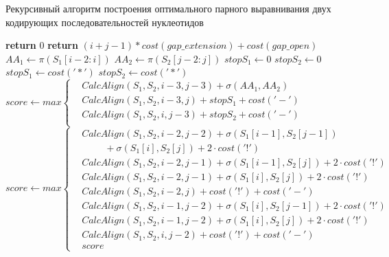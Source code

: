 \begin{algorithm}
	\caption{Рекурсивный алгоритм построения оптимального парного выравнивания двух кодирующих последовательностей нуклеотидов} \label{lst:pairwise}
	\begin{algorithmic}
		 
			\State \textbf{return} $0$ 
		\EndIf
			\State \textbf{return} $(i+j-1)*cost(gap\_extension) + cost(gap\_open)$ 
		\EndIf
		\State $AA_1 \gets \pi(S_1[i-2:i])$ 
		\State $AA_2 \gets \pi(S_2[j-2:j])$
		\State $stopS_1 \gets 0$
		\State $stopS_2 \gets 0$ 
			\State $stopS_1 \gets cost('*')$ 
		\EndIf
			\State $stopS_2 \gets cost('*')$ 
		\EndIf {}
		\State $score \gets max\left\{
		\begin{aligned}
			& CalcAlign(S_1, S_2, i-3, j-3) + \sigma(AA_1, AA_2)\\
			& CalcAlign(S_1, S_2, i-3, j) + stopS_1 + cost('-')\\
			& CalcAlign(S_1, S_2, i, j-3) + stopS_2 + cost('-')\\
		\end{aligned}
		\right.$ 
		\Statex {}
		\State $score \gets max\left\{
		\begin{aligned}
			& CalcAlign(S_1, S_2, i-2, j-2) + \sigma(S_1[i-1], S_2[j-1]) \\ 
			& \hspace{1cm}+ \sigma(S_1[i], S_2[j]) + 2\cdot cost('!')\\
			& CalcAlign(S_1, S_2, i-2, j-1) + \sigma(S_1[i-1], S_2[j]) + 2\cdot cost('!')\\
			& CalcAlign(S_1, S_2, i-2, j-1) + \sigma(S_1[i], S_2[j]) + 2\cdot cost('!')\\
			& CalcAlign(S_1, S_2, i-2, j) + cost('!') + cost('-')\\
			& CalcAlign(S_1, S_2, i-1, j-2) + \sigma(S_1[i], S_2[j-1]) + 2\cdot cost('!')\\
			& CalcAlign(S_1, S_2, i-1, j-2) + \sigma(S_1[i], S_2[j]) + 2\cdot cost('!')\\
			& CalcAlign(S_1, S_2, i, j-2) + cost('!') + cost('-')\\
			& score
		\end{aligned}
		\right.$
	\end{algorithmic}
\end{algorithm}

